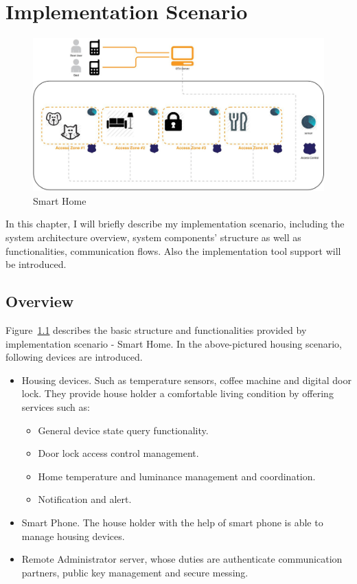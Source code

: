 \chapter{Implementation Scenario}
 \begin{figure}[!htbp]
	\centering
	\includegraphics[width=1\textwidth]{homeoverview.jpg}
		\caption{Smart Home}
	\label{fig:SmartHome}
\end{figure}
In this chapter, I will briefly describe my implementation scenario, including the system architecture overview, system components' structure as well as functionalities, communication flows. Also the implementation tool support will be introduced.
\section{Overview}


Figure~\ref{fig:SmartHome} describes the basic structure and functionalities provided by implementation scenario - Smart Home. In the above-pictured housing scenario, following devices are introduced.
\begin{itemize}
\item Housing devices. Such as temperature sensors, coffee machine and digital door lock. They provide house holder a comfortable living condition by offering services such as:
\begin{itemize}
\item General device state query functionality.
\item Door lock access control management.
\item Home temperature and luminance management and coordination.
\item Notification and alert.
\end{itemize}
\item Smart Phone. The house holder with the help of smart phone is able to manage housing devices.
\item Remote Administrator server, whose duties are authenticate communication partners, public key management and secure messing.
\end{itemize}

